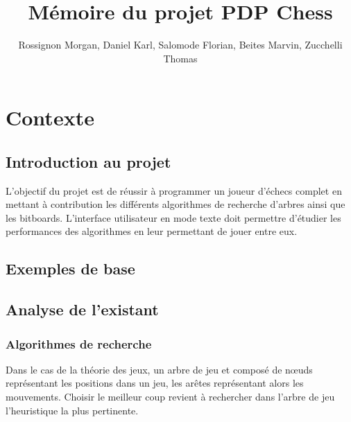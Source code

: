\documentclass{article}
\title{Mémoire du projet PDP Chess}
\author{Rossignon Morgan, Daniel Karl, Salomode Florian, Beites Marvin, Zucchelli Thomas}
\begin{document}
\maketitle

\tableofcontents
\newpage

\section{Contexte}

\subsection{Introduction au projet}

L'objectif du projet est de réussir à programmer un joueur d'échecs complet en mettant à contribution les différents algorithmes de recherche d'arbres ainsi que les bitboards. L'interface utilisateur en mode texte doit permettre d'étudier les performances des algorithmes en leur permettant de jouer entre eux.

\subsection{Exemples de base}

\subsection{Analyse de l'existant}

\subsubsection{Algorithmes de recherche}

Dans le cas de la théorie des jeux, un arbre de jeu et composé de nœuds représentant les positions dans un jeu, les arêtes représentant alors les mouvements. Choisir le meilleur coup revient à rechercher dans l'arbre de jeu l'heuristique la plus pertinente.
\end{document}
